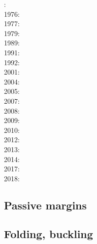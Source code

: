 {\scriptsize
{}: \cite{fouy75}\cite{sosr75}\\
1976: \cite{riss76}\\
1977: \cite{chtu77}\\
1979: \cite{riss79}\\
1989: \cite{boww89}\\
1991: \cite{worg91}\\
1992: \cite{rich92}\cite{wuvr92}\cite{zoba92}\cite{clko92}\\
2001: \cite{stsm01}\\
2004: \cite{ligu04}\\
2005: \cite{timr05}\\
2007: \cite{hert07}\\
2008: \cite{bilr08}\cite{ghhw08}\\
2009: \cite{ghhf09}\cite{nacl09}\\
2010: \cite{bepo10}\cite{yosh10}\\
2012: \cite{nalr12}\cite{ghho12}\cite{wagw12}\\
2013: \cite{ghhw13}\cite{wagw13}\\
2014: \cite{vagw14}\\
2017: \cite{grrb17}\\
2018: \cite{osss18}
}

\subsection{Passive margins} 

{\scriptsize
\noindent
\cite{clwv82}
\cite{lies86}
\cite{gebi05}
\cite{clbz08}
\cite{kasb08}
\cite{fasm10}
\cite{nigm10}
\cite{rapy11}
\cite{nigm11}
\cite{brfo11}
\cite{mana13}
\cite{yahb13}
\cite{macg14}
\cite{gebw15}
\cite{nigo15}
\cite{sahf18}
\cite{mube18}
\cite{tebu18}
\cite{zhli19}
}

\subsection{Folding, buckling} 

